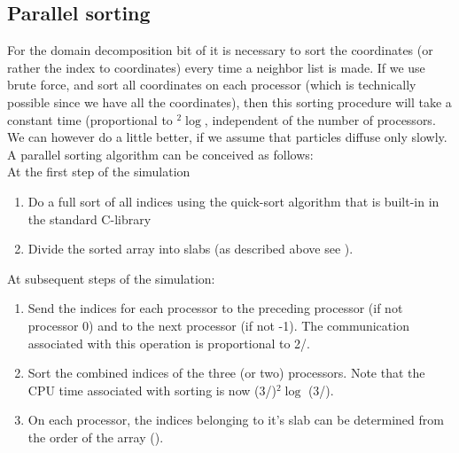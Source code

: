 \subsection{Parallel sorting}
\label{sec:parsort}
For the domain decomposition bit of {\gromacs} it is necessary to sort the 
coordinates (or rather the index to coordinates) every time a neighbor list is made.
If we use brute force, and sort all coordinates on each processor (which is 
technically possible since we have all the coordinates), then this sorting procedure
will take a constant time (proportional to {\natom}$^2\log${\natom}, 
independent of the number of processors. We can however do a little
better, if we assume that particles diffuse only slowly.
A parallel sorting algorithm can be conceived as follows: \\
At the first step of the simulation
\begin{enumerate}
\item	Do a full sort of all indices using {\eg} the  quick-sort algorithm that is
	built-in in the standard C-library
\item	Divide the sorted array into slabs (as described above see 
	).
\end{enumerate}
At subsequent steps of the simulation:
\begin{enumerate}
\item	Send the indices for each processor to the preceding processor (if
	not processor 0) and to the next processor (if not {\nproc}-1). The 
	communication associated with this operation is proportional to
	2{\natom}/{\nproc}.
\item	Sort the combined indices of the three (or two) processors. Note that
	the CPU time associated with sorting is now
	(3{\natom}/{\nproc})$^2\log$ (3{\natom}/{\nproc}).
\item	On each processor, the indices belonging to it's slab can be determined
	from the order of the array ().
\end{enumerate}

